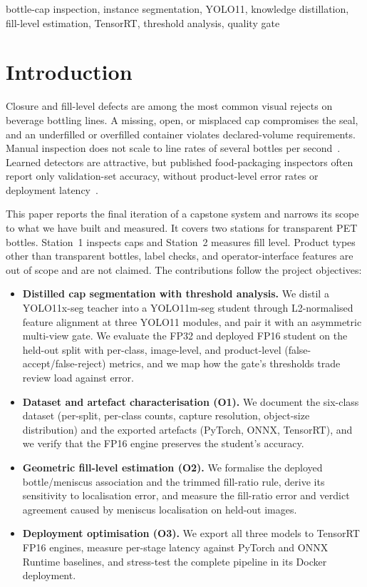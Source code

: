 \documentclass[conference]{IEEEtran}
\begin{document}
\begin{IEEEkeywords}
bottle-cap inspection, instance segmentation, YOLO11, knowledge distillation, fill-level estimation, TensorRT, threshold analysis, quality gate
\end{IEEEkeywords}

\section{Introduction}
Closure and fill-level defects are among the most common visual rejects on beverage bottling lines. A missing, open, or misplaced cap compromises the seal, and an underfilled or overfilled container violates declared-volume requirements. Manual inspection does not scale to line rates of several bottles per second~\cite{banus2021}. Learned detectors are attractive, but published food-packaging inspectors often report only validation-set accuracy, without product-level error rates or deployment latency~\cite{liu2025,chatchapol2024}.

This paper reports the final iteration of a capstone system and narrows its scope to what we have built and measured. It covers two stations for transparent PET bottles. Station~1 inspects caps and Station~2 measures fill level. Product types other than transparent bottles, label checks, and operator-interface features are out of scope and are not claimed. The contributions follow the project objectives:
\begin{itemize}
\item \textbf{Distilled cap segmentation with threshold analysis.} We distil a YOLO11x-seg teacher into a YOLO11m-seg student through L2-normalised feature alignment at three YOLO11 modules, and pair it with an asymmetric multi-view gate. We evaluate the FP32 and deployed FP16 student on the held-out split with per-class, image-level, and product-level (false-accept/false-reject) metrics, and we map how the gate's thresholds trade review load against error.
\item \textbf{Dataset and artefact characterisation (O1).} We document the six-class dataset (per-split, per-class counts, capture resolution, object-size distribution) and the exported artefacts (PyTorch, ONNX, TensorRT), and we verify that the FP16 engine preserves the student's accuracy.
\item \textbf{Geometric fill-level estimation (O2).} We formalise the deployed bottle/meniscus association and the trimmed fill-ratio rule, derive its sensitivity to localisation error, and measure the fill-ratio error and verdict agreement caused by meniscus localisation on held-out images.
\item \textbf{Deployment optimisation (O3).} We export all three models to TensorRT FP16 engines, measure per-stage latency against PyTorch and ONNX Runtime baselines, and stress-test the complete pipeline in its Docker deployment.
\end{itemize}
\end{document}

